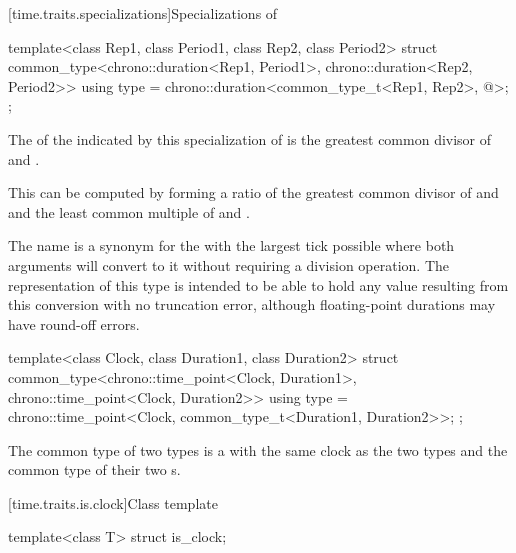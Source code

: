 [time.traits.specializations]{Specializations of }

%
\begin{itemdecl}
template<class Rep1, class Period1, class Rep2, class Period2>
struct common_type<chrono::duration<Rep1, Period1>, chrono::duration<Rep2, Period2>> {
  using type = chrono::duration<common_type_t<Rep1, Rep2>, @\seebelow@>;
};
\end{itemdecl}

\pnum
The  of the  indicated by this specialization of
 is the greatest common divisor of  and
.
\begin{note}
This can be computed by forming a ratio of the
greatest common divisor of  and  and the
least common multiple of  and .
\end{note}

\pnum
\begin{note}
The  name  is a synonym for the
 with the largest tick  possible where both
 arguments will convert to it without requiring a division
operation. The representation of this type is intended to be able to hold any
value resulting from this conversion with no truncation error, although
floating-point durations may have round-off errors.
\end{note}

%
\begin{itemdecl}
template<class Clock, class Duration1, class Duration2>
  struct common_type<chrono::time_point<Clock, Duration1>, chrono::time_point<Clock, Duration2>> {
    using type = chrono::time_point<Clock, common_type_t<Duration1, Duration2>>;
};
\end{itemdecl}

\pnum
The common type of two  types is a  with the same
clock as the two types and the common type of their two s.

[time.traits.is.clock]{Class template }

%
\begin{itemdecl}
template<class T> struct is_clock;
\end{itemdecl}

